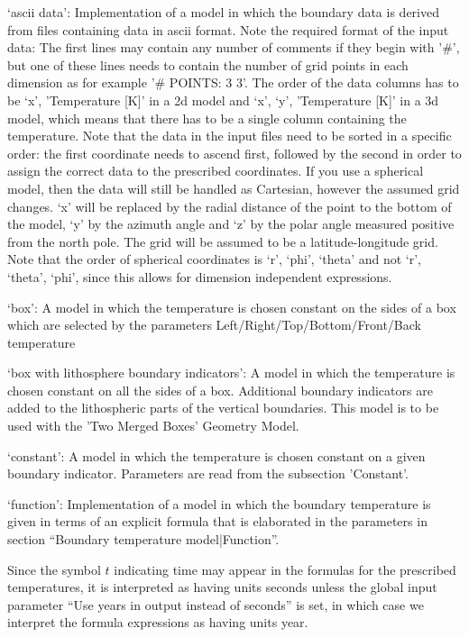 \begin{itemize}
`ascii data': Implementation of a model in which the boundary data is derived from files containing data in ascii format. Note the required format of the input data: The first lines may contain any number of comments if they begin with '\#', but one of these lines needs to contain the number of grid points in each dimension as for example '\# POINTS: 3 3'. The order of the data columns has to be `x', 'Temperature [K]' in a 2d model and  `x', `y', 'Temperature [K]' in a 3d model, which means that there has to be a single column containing the temperature. Note that the data in the input files need to be sorted in a specific order: the first coordinate needs to ascend first, followed by the second in order to assign the correct data to the prescribed coordinates. If you use a spherical model, then the data will still be handled as Cartesian, however the assumed grid changes. `x' will be replaced by the radial distance of the point to the bottom of the model, `y' by the azimuth angle and `z' by the polar angle measured positive from the north pole. The grid will be assumed to be a latitude-longitude grid. Note that the order of spherical coordinates is `r', `phi', `theta' and not `r', `theta', `phi', since this allows for dimension independent expressions.

`box': A model in which the temperature is chosen constant on the sides of a box which are selected by the parameters Left/Right/Top/Bottom/Front/Back temperature

`box with lithosphere boundary indicators': A model in which the temperature is chosen constant on all the sides of a box. Additional boundary indicators are added to the lithospheric parts of the vertical boundaries. This model is to be used with the 'Two Merged Boxes' Geometry Model.

`constant': A model in which the temperature is chosen constant on a given boundary indicator.  Parameters are read from the subsection 'Constant'.

`function': Implementation of a model in which the boundary temperature is given in terms of an explicit formula that is elaborated in the parameters in section ``Boundary temperature model|Function''. 

Since the symbol $t$ indicating time may appear in the formulas for the prescribed temperatures, it is interpreted as having units seconds unless the global input parameter ``Use years in output instead of seconds'' is set, in which case we interpret the formula expressions as having units year.


\end{itemize}
